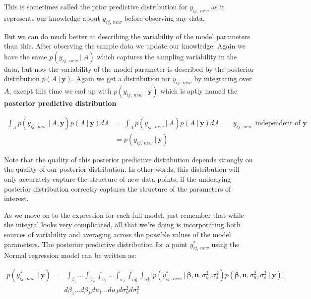 \documentclass[12pt,twoside]{reedthesis}
\begin{document}
This is sometimes called the prior predictive distribution for \(y_{ij, \ new}\) as it represents our knowledge about \(y_{ij, \ new}\) before observing any data.

But we can do much better at describing the variability of the model parameters than this. After observing the sample data we update our knowledge. Again we have the same \(p(y_{ij, \ new} \ | \ A)\) which captures the sampling variability in the data, but now the variability of the model parameter is described by the posterior distribution \(p(A \ | \ \mathbf{y})\). Again we get a distribution for \(y_{ij, \ new}\) by integrating over \(A\), except this time we end up with \(p(y_{ij, \ new} \ | \ \mathbf{y})\) which is aptly named the \textbf{posterior predictive distribution}

\[
\begin{aligned}
\int_A p(y_{ij, \ new} \ | \ A, \mathbf{y})p(A \ | \ \mathbf{y})dA &=  \int_A p(y_{ij, \ new} \ | \ A)p(A \ | \ \mathbf{y})dA \qquad y_{ij, \ new} \ \  \text{independent of } \mathbf{y} \\
&= p(y_{ij, \ new} \ | \ \mathbf{y})\
\end{aligned}
\]

Note that the quality of this posterior predictive distribution depends strongly on the quality of our posterior distribution. In other words, this distribution will only accurately capture the structure of new data points, if the underlying posterior distribution correctly captures the structure of the parameters of interest.

As we move on to the expression for each full model, just remember that while the integral looks very complicated, all that we're doing is incorporating both sources of variability and averaging across the possible values of the model parameters. The posterior predictive distribution for a point \(y^*_{ij, \ new}\) using the Normal regression model can be written as:

\[
\begin{aligned}
p(y^*_{ij, \ new} \ | \ \mathbf{y}) &=  \int_{\beta_1}  \dots \int_{\beta_P} \int_{u_1} \dots \int_{u_J} \int_{\sigma_{u}^2} \int_{\sigma_{\varepsilon}^2} \bigg[p(y^*_{ij, \ new} \ | \ \boldsymbol{\beta}, \boldsymbol{u}, \sigma_{u}^2, \sigma_{\varepsilon}^2)p(\boldsymbol{\beta}, \mathbf{u}, \sigma_{u}^2, \sigma_{\varepsilon}^2 \ | \ \mathbf{y})\bigg] \\
& \ \ \ \ \ d\beta_1 ...  d\beta_Pdu_1...du_Jd\sigma_{u}^2d\sigma_{\varepsilon}^2
\end{aligned}
\]
\end{document}
